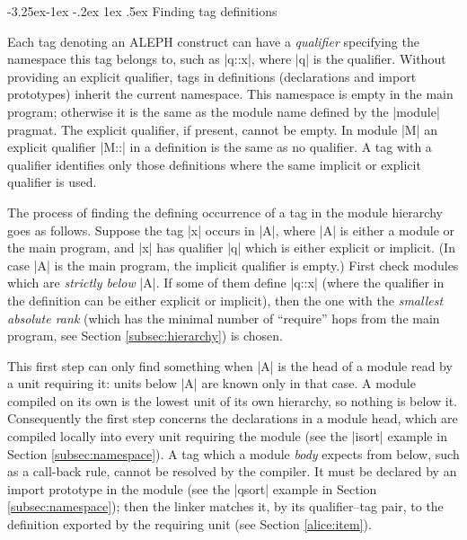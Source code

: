 \documentclass[titlepage]{article}
\makeatletter
\newcommand\A{\textsf{ALEPH}}
\def\cc{\kern-0.6pt:\kern-1pt:\kern-0.5pt}
\newcommand\g[1]{\textsf{\color{blue!90!black}#1}}
\renewcommand\subsection{%
\@startsection{subsection}{2}{\z@}%
   {-3.25ex\@plus -1ex \@minus -.2ex}%
   {1ex \@plus .5ex}%
   {\normalfont\normalsize\bfseries}}
\makeatother
\begin{document}

\subsection{Finding tag definitions}\label{subsec:qualifier}

Each \g{tag} denoting an \A{} construct can have a \emph{qualifier}
specifying the namespace this tag belongs to, such as \pp|q{\cc}x|,
where \pp|q| is the qualifier. Without providing an explicit qualifier, tags
in definitions (declarations and import prototypes) inherit the current
namespace. This namespace is empty in the main program; otherwise it is the
same as the module name defined by the \pp|module| pragmat. The explicit
qualifier, if present, cannot be empty. In module \pp|M| an explicit
qualifier \pp|M{\cc}| in a definition is the same as no qualifier. A \g{tag}
with a qualifier identifies only those definitions where the same implicit or
explicit qualifier is used.

The process of finding the defining occurrence of a \g{tag} in the module
hierarchy goes as follows. Suppose the \g{tag} \pp|x| occurs in \pp|A|,
where \pp|A| is either a module or the main program, and \pp|x| has
qualifier \pp|q| which is either explicit or implicit. (In case \pp|A| is
the main program, the implicit qualifier is empty.) First check modules
which are \emph{strictly below} \pp|A|. If some of them define \pp|q{\cc}x|
(where the qualifier in the definition can be either explicit or implicit),
then the one with the \emph{smallest absolute rank} (which has the minimal
number of ``require'' hops from the main program, see Section
\ref{subsec:hierarchy}) is chosen.

This first step can only find something when \pp|A| is the head of a
module read by a unit requiring it: units below \pp|A| are known only in
that case. A module compiled on its own is the lowest unit of its own
hierarchy, so nothing is below it. Consequently the first step concerns
the declarations in a module head, which are compiled locally into every
unit requiring the module (see the \pp|isort| example in Section
\ref{subsec:namespace}). A tag which a module \emph{body} expects from
below, such as a call-back rule, cannot be resolved by the compiler. It
must be declared by an import prototype in the module (see the
\pp|qsort| example in Section \ref{subsec:namespace}); then the linker
matches it, by its qualifier--tag pair, to the definition exported by
the requiring unit (see Section \ref{alice:item}).
\end{document}
